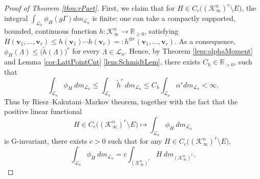 \documentclass[11pt,a4paper,reqno]{amsart}
\theoremstyle{definition}
\theoremstyle{remark}
\numberwithin{equation}{section}
\begin{document}
\begin{proof}[Proof of Theorem \ref{thm:rPart}]
First, we claim that for $H\in C_c\big((\mathcal K_\infty^n)^r\setminus E\big)$, the integral $\int_{\mathcal L_n} \phi_H(g\Gamma) dm_{\mathcal L_n}$ is finite: one can take a compactly supported, bounded, continuous function $h:\mathcal{K}_{\infty}^n\rightarrow \mathbb{R}_{\geq 0}$, satisfying $H(\mathbf{v}_1,\dots,\mathbf{v}_r)\leq h(\mathbf{v}_1)\cdots h(\mathbf{v}_r)=:h^{\otimes r}(\mathbf{v}_1,\dots,\mathbf{v}_r)$. As a consequence, $\phi_H(\Lambda)\leq \big(\widetilde{h}(\Lambda)\big)^r$ for every $\Lambda\in \mathcal{L}_n$. Hence, by Theorem \ref{lem:alphaMoment} and Lemma \ref{cor:LattPointCnt} \eqref{lem:SchmidtLem}, there exists $C_h\in \mathbb R_{>0}$, such that
    \begin{equation*}
        \int_{\mathcal{L}_n} \phi_H \: dm_{\mathcal{L}_n}\leq \int_{\mathcal{L}_n}\widetilde{h}^r\:dm_{\mathcal{L}_n}\leq C_h\int_{\mathcal{L}_n}\alpha^rdm_{\mathcal{L}_n}<\infty.
    \end{equation*}
Thus by Riesz--Kakutani--Markov theorem, together with the fact that the positive linear functional $$H\in C_c\big((\mathcal K_\infty^n)^r\setminus E\big)\mapsto \int_{\mathcal L_n} \phi_H \:dm_{\mathcal L_n}$$ is $\mathrm{G}$-invariant, there exists $c>0$ such that for any $H\in C_c\big((\mathcal K_\infty^n)^r\setminus E\big)$,
    \begin{equation}
    \label{eqn:inthat(F)=cint(F)}    \int_{\mathcal{L}_n}\phi_H\: dm_{\mathcal{L}_n}=c\int_{\left(\mathcal{K}_{\infty}^n\right)^r} H\: dm_{\left(\mathcal{K}_{\infty}^n\right)^r}.\end{equation}


\end{proof}
\end{document}
